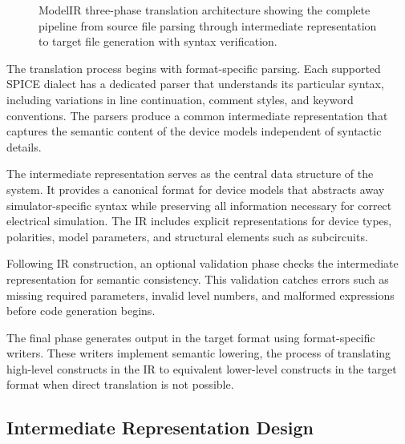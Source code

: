 \documentclass[conference]{IEEEtran}
\begin{document}
\begin{figure}[htbp]
\caption{ModelIR three-phase translation architecture showing the complete pipeline from source file parsing through intermediate representation to target file generation with syntax verification.}
\label{fig:architecture}
\end{figure}

The translation process begins with format-specific parsing. Each supported SPICE dialect has a dedicated parser that understands its particular syntax, including variations in line continuation, comment styles, and keyword conventions. The parsers produce a common intermediate representation that captures the semantic content of the device models independent of syntactic details.

The intermediate representation serves as the central data structure of the system. It provides a canonical format for device models that abstracts away simulator-specific syntax while preserving all information necessary for correct electrical simulation. The IR includes explicit representations for device types, polarities, model parameters, and structural elements such as subcircuits.

Following IR construction, an optional validation phase checks the intermediate representation for semantic consistency. This validation catches errors such as missing required parameters, invalid level numbers, and malformed expressions before code generation begins.

The final phase generates output in the target format using format-specific writers. These writers implement semantic lowering, the process of translating high-level constructs in the IR to equivalent lower-level constructs in the target format when direct translation is not possible.

\subsection{Intermediate Representation Design}
\end{document}
